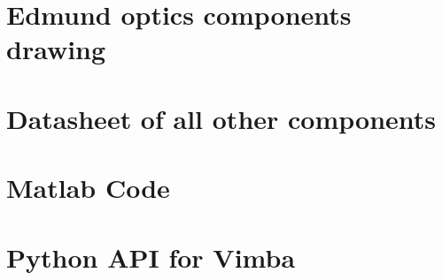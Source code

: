 \chapter{Edmund optics components drawing} \label{App:Edmund_MEP}

\newpage

\newpage

\newpage

\newpage

\newpage

\chapter{Datasheet of all other components}

\newpage

\chapter{Matlab Code} \label{App:Matlab}

\newpage

\newpage

\chapter{Python API for Vimba} \label{App:pythonVimba}

\newpage